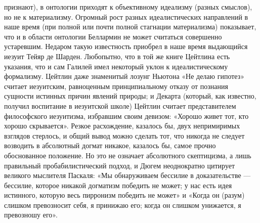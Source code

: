 признают), в онтологии приходят к объективному идеализму (разных смыслов), но
не к материализму. Огромный рост разных идеалистических направлений в наше
время (при полной или почти полной стагнации материализма) показывает, что и в
области онтологии Беллармин не может считаться совершенно устаревшим. Недаром
такую известность приобрел в наше время выдающийся иезуит Тейяр де Шарден.
Любопытно, что в той же книге Цейтлина есть указания, что и сам Галилей имел
некоторый уклон к идеалистическому формализму. Цейтлин даже знаменитый лозунг
Ньютона «Не делаю гипотез» считает иезуитским, равноценным принципиальному
отказу от познания сущности истинных причин явлений природы; и Декарта
(который, как известно, получил воспитание в иезуитской школе) Цейтлин считает
представителем философского иезуитизма, избравшим своим девизом: «Хорошо живет
тот, кто хорошо скрывается». Резкое расхождение, казалось бы, двух непримиримых
взглядов стерлось, и общий вывод можно сделать тот, что никогда не следует
возводить в абсолютный догмат никакое, казалось бы, самое прочно обоснованное
положение. Но это не означает абсолютного скептицизма, а лишь правильный
пробабилистический подход, и Дюгем неоднократно цитирует великого мыслителя
Паскаля: «Мы обнаруживаем бессилие в доказательстве --- бессилие, которое никакой
догматизм победить не может; у нас есть идея истинного, которую весь пирронизм
победить не может» и «Когда он (разум) слишком превозносит себя, я принижаю
его; когда он слишком унижается, я превозношу его».


